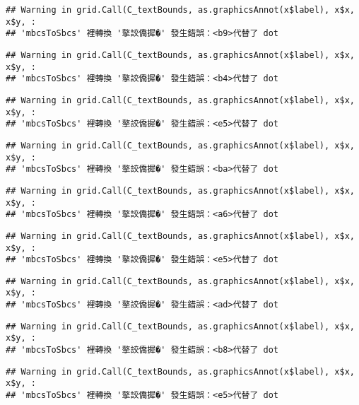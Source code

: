 \documentclass[
]{article}
\begin{document}
\begin{verbatim}
## Warning in grid.Call(C_textBounds, as.graphicsAnnot(x$label), x$x, x$y, :
## 'mbcsToSbcs' 裡轉換 '摮詨僑摨�' 發生錯誤：<b9>代替了 dot
\end{verbatim}

\begin{verbatim}
## Warning in grid.Call(C_textBounds, as.graphicsAnnot(x$label), x$x, x$y, :
## 'mbcsToSbcs' 裡轉換 '摮詨僑摨�' 發生錯誤：<b4>代替了 dot
\end{verbatim}

\begin{verbatim}
## Warning in grid.Call(C_textBounds, as.graphicsAnnot(x$label), x$x, x$y, :
## 'mbcsToSbcs' 裡轉換 '摮詨僑摨�' 發生錯誤：<e5>代替了 dot
\end{verbatim}

\begin{verbatim}
## Warning in grid.Call(C_textBounds, as.graphicsAnnot(x$label), x$x, x$y, :
## 'mbcsToSbcs' 裡轉換 '摮詨僑摨�' 發生錯誤：<ba>代替了 dot
\end{verbatim}

\begin{verbatim}
## Warning in grid.Call(C_textBounds, as.graphicsAnnot(x$label), x$x, x$y, :
## 'mbcsToSbcs' 裡轉換 '摮詨僑摨�' 發生錯誤：<a6>代替了 dot
\end{verbatim}

\begin{verbatim}
## Warning in grid.Call(C_textBounds, as.graphicsAnnot(x$label), x$x, x$y, :
## 'mbcsToSbcs' 裡轉換 '摮詨僑摨�' 發生錯誤：<e5>代替了 dot
\end{verbatim}

\begin{verbatim}
## Warning in grid.Call(C_textBounds, as.graphicsAnnot(x$label), x$x, x$y, :
## 'mbcsToSbcs' 裡轉換 '摮詨僑摨�' 發生錯誤：<ad>代替了 dot
\end{verbatim}

\begin{verbatim}
## Warning in grid.Call(C_textBounds, as.graphicsAnnot(x$label), x$x, x$y, :
## 'mbcsToSbcs' 裡轉換 '摮詨僑摨�' 發生錯誤：<b8>代替了 dot
\end{verbatim}

\begin{verbatim}
## Warning in grid.Call(C_textBounds, as.graphicsAnnot(x$label), x$x, x$y, :
## 'mbcsToSbcs' 裡轉換 '摮詨僑摨�' 發生錯誤：<e5>代替了 dot
\end{verbatim}
\end{document}
